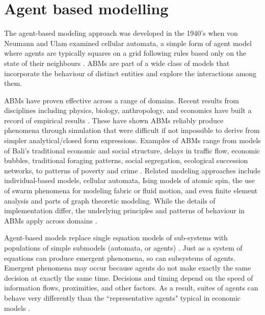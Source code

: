 

\section{Agent based modelling}

The agent-based modeling approach was developed in the 1940's when von Neumann and Ulam examined cellular automata, a simple form of agent model where agents are typically squares on a grid following rules based only on the state of their neighbours \cite{banksStatisticalChallengesAgentBased2021}. ABMs %
are part of a wide class of models that incorporate the behaviour of distinct entities and explore the interactions among them. 
    
ABMs have proven effective across a range of domains. Recent results from disciplines including physics, biology, anthropology, and economics have built a record of empirical results \cite{parkerMultiAgentSystemsSimulation2003, parker_multi-agent_2003, helbing_social_2011-1}. 
These have shown ABMs reliably produce phenomena through simulation that were difficult if not impossible to derive from simpler analytical/closed form expressions. 
Examples of ABMs range from models of Bali's traditional economic and social structure, delays in traffic flow, economic bubbles, 
traditional foraging patterns, %
social segregation, ecological succession networks, to patterns of poverty and crime \cite{open_agent_based_modeling_consortium_comses_????}. %
Related modeling approaches include individual-based models, cellular automata, Ising models of atomic spin, the use of swarm phenomena for modeling fabric or fluid motion, and even finite element analysis and parts of graph theoretic modeling.  While the details of implementation differ, the underlying principles and patterns of behaviour in ABMs apply across domains \cite{shalizi_methods_2006}.  

Agent-based models replace single equation models of sub-systems with populations of simple submodels (automata, or agents) \cite{shalizi_methods_2006}. Just as a system of equations can produce emergent phenomena, so can subsystems of agents. Emergent phenomena may occur because agents do not make exactly the same decision at exactly the same time. Decisions and timing depend on the speed of information flows, proximities, and other factors. As a result, suites of agents can behave very differently than the ``representative agents" typical in economic models \cite{darley_towards_1999, tesfatsion_agent-based_2002}.


